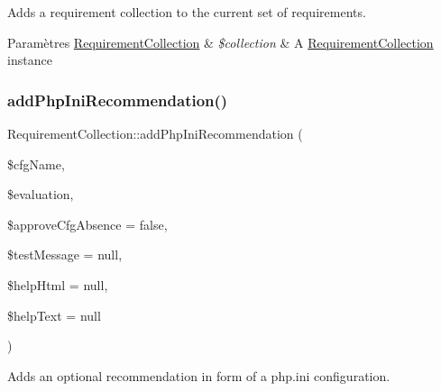 Adds a requirement collection to the current set of requirements.


\begin{DoxyParams}[1]{Paramètres}
\hyperlink{classRequirementCollection}{Requirement\+Collection} & {\em \$collection} & A \hyperlink{classRequirementCollection}{Requirement\+Collection} instance \\
\hline
\end{DoxyParams}
\mbox{\label{classRequirementCollection_afeba77fa6ca369631f8a602800e9e29d}} 
\subsubsection{\texorpdfstring{add\+Php\+Ini\+Recommendation()}{addPhpIniRecommendation()}}
{\footnotesize\ttfamily Requirement\+Collection\+::add\+Php\+Ini\+Recommendation (\begin{DoxyParamCaption}\item[{}]{\$cfg\+Name,  }\item[{}]{\$evaluation,  }\item[{}]{\$approve\+Cfg\+Absence = {\ttfamily false},  }\item[{}]{\$test\+Message = {\ttfamily null},  }\item[{}]{\$help\+Html = {\ttfamily null},  }\item[{}]{\$help\+Text = {\ttfamily null} }\end{DoxyParamCaption})}

Adds an optional recommendation in form of a php.\+ini configuration.



